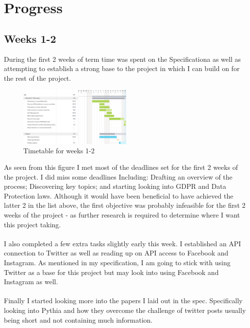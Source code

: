 \section{Progress}
\label{sec:progress}
\subsection{Weeks 1-2}
During the first 2 weeks of term time was spent on the Specificationa as well as attempting to establish a strong
base to the project in which I can build on for the rest of the project.

\begin{figure}
    \centering
    \includegraphics[width=0.5\textwidth]{../images/timetableweek1-2.png}
    \caption{Timetable for weeks 1-2}
    \label{fig:timetableweek1-2}
\end{figure}

As seen from this figure I met most of the deadlines set for the first 2 weeks of the project. I did miss some deadlines
Including: Drafting an overview of the process; Discovering key topics; and starting looking into GDPR and Data Protection laws.
Although it would have been beneficial to have achieved the latter 2 in the list above, the first objective was probably infeasible
for the first 2 weeks of the project - as further research is required to determine where I want this project taking.\\\\

I also completed a few extra tasks slightly early this week. I established an API connection to Twitter as well as reading up on
API access to Facebook and Instagram. As mentioned in my specification, I am going to stick with using Twitter as a base for
this project but may look into using Facebook and Instagram as well.\\\\

Finally I started looking more into the papers I laid out in the spec. Specifically looking into Pythia and how they overcome
the challenge of twitter posts usually being short and not containing much information.